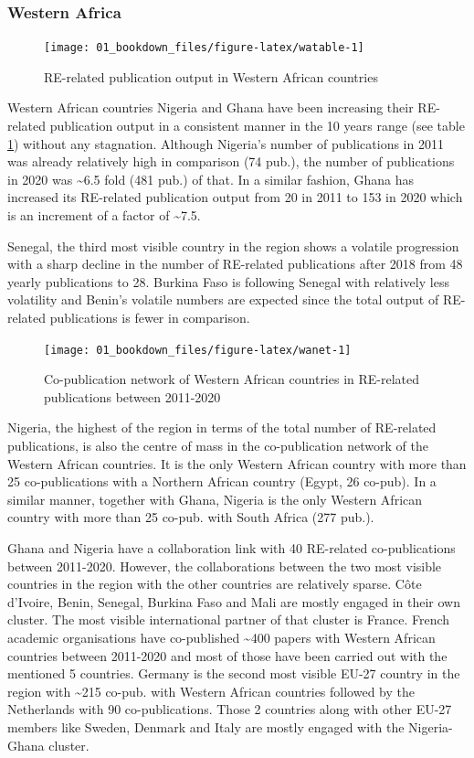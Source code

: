 \documentclass[
]{book}
\begin{document}
\hypertarget{western-africa}{%
\subsubsection{Western Africa}\label{western-africa}}

\begin{figure}
\texttt{[image: 01\_bookdown\_files/figure-latex/watable-1]} \caption{RE-related publication output in Western African countries}\label{fig:watable}
\end{figure}

Western African countries Nigeria and Ghana have been increasing their RE-related publication
output in a consistent manner in the 10 years range (see table \ref{fig:watable}) without any stagnation. Although Nigeria's number of publications in 2011 was already relatively high in comparison (74 pub.), the number of publications in 2020 was \textasciitilde6.5 fold (481 pub.) of that. In a similar fashion, Ghana has increased its RE-related publication output from 20 in 2011 to 153 in 2020 which is an increment of a factor of \textasciitilde7.5.

Senegal, the third most visible country in the region shows a volatile progression with a sharp decline in the number of RE-related publications after 2018 from 48 yearly publications to 28. Burkina Faso is following Senegal with relatively less volatility and Benin's volatile numbers are expected since the total output of RE-related publications is fewer in comparison.

\begin{figure}
\texttt{[image: 01\_bookdown\_files/figure-latex/wanet-1]} \caption{Co-publication network of Western African countries in RE-related publications between 2011-2020}\label{fig:wanet}
\end{figure}

Nigeria, the highest of the region in terms of the total number of RE-related publications, is also the centre of mass in the co-publication network of the Western African countries. It is the only Western African country with more than 25 co-publications with a Northern African country (Egypt, 26 co-pub). In a similar manner, together with Ghana, Nigeria is the only Western African country with more than 25 co-pub. with South Africa (277 pub.).

Ghana and Nigeria have a collaboration link with 40 RE-related co-publications between 2011-2020. However, the collaborations between the two most visible countries in the region with the other countries are relatively sparse. Côte d'Ivoire, Benin, Senegal, Burkina Faso and Mali are mostly engaged in their own cluster. The most visible international partner of that cluster is France. French academic organisations have co-published \textasciitilde400 papers with Western African countries between 2011-2020 and most of those have been carried out with the mentioned 5 countries. Germany is the second most visible EU-27 country in the region with \textasciitilde215 co-pub. with Western African countries followed by the Netherlands with 90 co-publications. Those 2 countries along with other EU-27 members like Sweden, Denmark and Italy are mostly engaged with the Nigeria-Ghana cluster.
\end{document}
